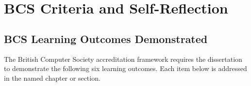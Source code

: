 \chapter{BCS Criteria and Self-Reflection}
\label{ch:bcs}

\section{BCS Learning Outcomes Demonstrated}

The British Computer Society accreditation framework requires the
dissertation to demonstrate the following six learning outcomes.
Each item below is addressed in the named chapter or section.

